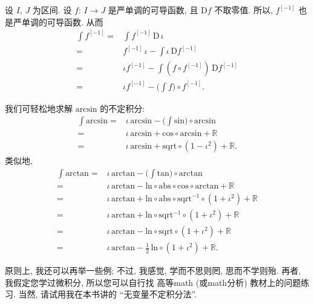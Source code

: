 \begin{example}
    设 $I$, $J$ 为区间.
    设 $f$: $I \to J$ 是严单调的可导函数,
    且 $\mathrm{D}f$ 不取零值.
    所以, $f^{[-1]}$ 也是严单调的可导函数.
    从而
    \begin{align*}
        \int {f^{[-1]}}
        = {} & \int {f^{[-1]}\, \mathrm{D}\,\iota}                            \\
        = {} & f^{[-1]}\,\iota - \int {\iota\,\mathrm{D}f^{[-1]}}             \\
        = {} & \iota f^{[-1]} - \int {(f \circ f^{[-1]})\,\mathrm{D}f^{[-1]}} \\
        = {} & \iota f^{[-1]} - \Bigg( \int {f} \Bigg) \circ f^{[-1]}.
    \end{align*}
\end{example}

\begin{example}
    我们可轻松地求解 $\mathrm{arcsin}$ 的不定积分:
    \begin{align*}
        \int {\mathrm{arcsin}}
        = {} & \iota\, \mathrm{arcsin} - \Bigg( \int {\mathrm{sin}} \Bigg) \circ \mathrm{arcsin} \\
        = {} & \iota\, \mathrm{arcsin} + \mathrm{cos} \circ \mathrm{arcsin} + \mathbb{R}         \\
        = {} & \iota\, \mathrm{arcsin} + \mathrm{sqrt} \circ (1 - \iota^2) + \mathbb{R}.
    \end{align*}
    类似地,
    \begin{align*}
        \int {\mathrm{arctan}}
        = {} & \iota\, \mathrm{arctan} - \Bigg( \int {\mathrm{tan}} \Bigg) \circ \mathrm{arctan}                                  \\
        = {} & \iota\, \mathrm{arctan} - \mathrm{ln} \circ \mathrm{abs} \circ \mathrm{cos} \circ \mathrm{arctan} + \mathbb{R}     \\
        = {} & \iota\, \mathrm{arctan} + \mathrm{ln} \circ \mathrm{abs} \circ \mathrm{sqrt}^{-1} \circ (1 + \iota^2) + \mathbb{R} \\
        = {} & \iota\, \mathrm{arctan} + \mathrm{ln} \circ \mathrm{sqrt}^{-1} \circ (1 + \iota^2) + \mathbb{R}                    \\
        = {} & \iota\, \mathrm{arctan} - \mathrm{ln} \circ \mathrm{sqrt} \circ (1 + \iota^2) + \mathbb{R}                         \\
        = {} & \iota\, \mathrm{arctan} - \frac{1}{2}\,\mathrm{ln} \circ (1 + \iota^2) + \mathbb{R}.
    \end{align*}
\end{example}

原则上, 我还可以再举一些例;
不过, 我感觉, 学而不思则罔, 思而不学则殆.
再者, 我假定您学过微积分,
所以您可以自行找%
高等\gls{math} (或\gls{math}分析) 教材上的问题练习.
当然, 请试用我在本书讲的 ``无变量不定积分法''.
